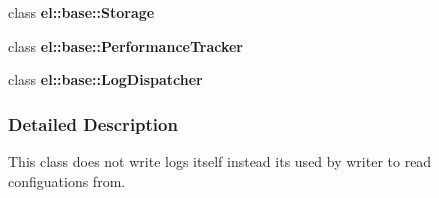 \begin{DoxyCompactItemize}
\item 
\hypertarget{a00048_acc1efd1b8a3fc5e0028dab98b02e550a}{}class {\bfseries el\+::base\+::\+Storage}\label{a00048_acc1efd1b8a3fc5e0028dab98b02e550a}

\item 
\hypertarget{a00048_a6a4d7851e1984800be3c230f06a79528}{}class {\bfseries el\+::base\+::\+Performance\+Tracker}\label{a00048_a6a4d7851e1984800be3c230f06a79528}

\item 
\hypertarget{a00048_a9b37b28ea1c5f8f862cc89f135711d92}{}class {\bfseries el\+::base\+::\+Log\+Dispatcher}\label{a00048_a9b37b28ea1c5f8f862cc89f135711d92}

\end{DoxyCompactItemize}


\subsubsection{Detailed Description}
This class does not write logs itself instead its used by writer to read configuations from. 